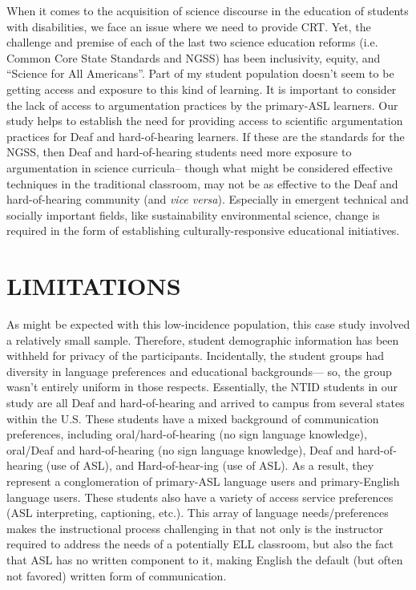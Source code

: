 \documentclass[11.5pt]{sig-alternate} %
\begin{document}
\begin{large}
When it comes to the acquisition of science discourse in the education of students with disabilities, we face an issue where we need to provide CRT. Yet, the challenge and premise of each of the last two science education reforms (i.e. Common Core State Standards and NGSS) has been inclusivity, equity, and “Science for All Americans”. Part of my student population doesn’t seem to be getting access and exposure to this kind of learning. It is important to consider the lack of access to argumentation practices by the primary-ASL learners. Our study helps to establish the need for providing access to scientific argumentation practices for Deaf and hard-of-hearing learners. If these are the standards for the NGSS, then Deaf and hard-of-hearing students need more exposure to argumentation in science curricula– though what might be considered effective techniques in the traditional classroom, may not be as effective to the Deaf and hard-of-hearing community (and \textit{vice versa}). Especially in emergent technical and socially important fields, like sustainability environmental science, change is required in the form of establishing culturally-responsive educational initiatives. 

\section*{LIMITATIONS}

As might be expected with this low-incidence population, this case study involved a relatively small sample. Therefore, student demographic information has been withheld for privacy of the participants. Incidentally, the student groups had diversity in language preferences and educational backgrounds— so, the group wasn’t entirely uniform in those respects. Essentially, the NTID students in our study are all Deaf and hard-of-hearing and arrived to campus from  several states within the U.S. These students have a mixed background of communication preferences, including oral/hard-of-hearing (no sign language knowledge), oral/Deaf and hard-of-hearing (no sign language knowledge), Deaf and hard-of-hearing (use of ASL), and Hard-of-hear-ing (use of ASL). As a result, they represent a conglomeration of primary-ASL language users and primary-English language users. These students also have a variety of access service preferences (ASL interpreting, captioning, etc.). This array of language needs/preferences makes the instructional process challenging in that not only is the instructor required to address the needs of a potentially ELL classroom, but also the fact that ASL has no written component to it, making English the default (but often not favored) written form of communication. 


\end{large}
\end{document}
